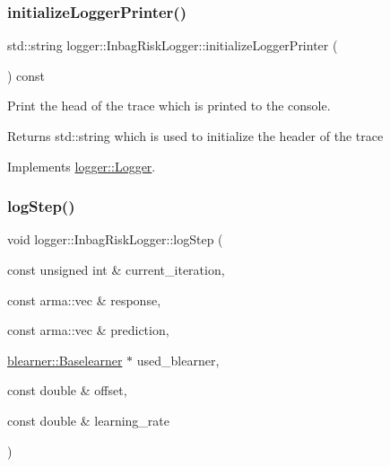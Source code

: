 \mbox{\label{classlogger_1_1_inbag_risk_logger_ab793454f28dae8d0901852b41a910ec7}} 
\subsubsection{\texorpdfstring{initialize\+Logger\+Printer()}{initializeLoggerPrinter()}}
{\footnotesize\ttfamily std\+::string logger\+::\+Inbag\+Risk\+Logger\+::initialize\+Logger\+Printer (\begin{DoxyParamCaption}{ }\end{DoxyParamCaption}) const\hspace{0.3cm}{\ttfamily [virtual]}}



Print the head of the trace which is printed to the console. 

\begin{DoxyReturn}{Returns}
{\ttfamily std\+::string} which is used to initialize the header of the trace 
\end{DoxyReturn}


Implements \mbox{\hyperlink{classlogger_1_1_logger_a825f96e8564ac4013ff09ef842c0aeec}{logger\+::\+Logger}}.

\mbox{\label{classlogger_1_1_inbag_risk_logger_ad90612e1b684287a29bdbde1077d65d7}} 
\subsubsection{\texorpdfstring{log\+Step()}{logStep()}}
{\footnotesize\ttfamily void logger\+::\+Inbag\+Risk\+Logger\+::log\+Step (\begin{DoxyParamCaption}\item[{const unsigned int \&}]{current\+\_\+iteration,  }\item[{const arma\+::vec \&}]{response,  }\item[{const arma\+::vec \&}]{prediction,  }\item[{\mbox{\hyperlink{classblearner_1_1_baselearner}{blearner\+::\+Baselearner}} $\ast$}]{used\+\_\+blearner,  }\item[{const double \&}]{offset,  }\item[{const double \&}]{learning\+\_\+rate }\end{DoxyParamCaption})\hspace{0.3cm}{\ttfamily [virtual]}}



